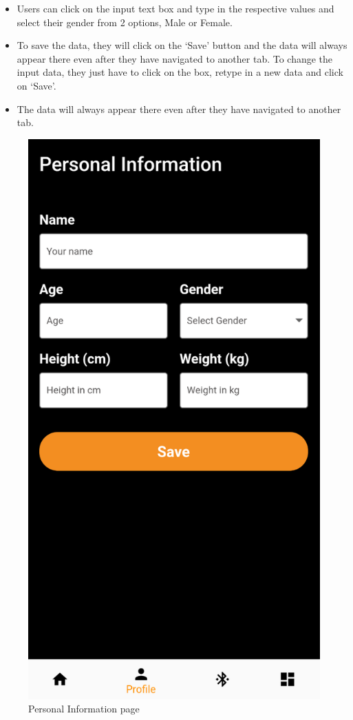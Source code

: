 \documentclass[a4paper]{scrreprt}
\begin{document}
\begin{itemize}
    \item Users can click on the input text box and type in the respective values and select their gender from 2 options, Male or Female.
    \item To save the data, they will click on the ‘Save’ button and the data will always appear there even after they have navigated to another tab. To change the input data, they just have to click on the box, retype in a new data and click on ‘Save’.
    \item The data will always appear there even after they have navigated to another tab.
\end{itemize}

\begin{figure}[h]
  \centering
  \includegraphics[scale=0.43]{personal_info.png}
  \caption{Personal Information page}
  \label{fig:personal-info}
\end{figure}
\clearpage
\end{document}
